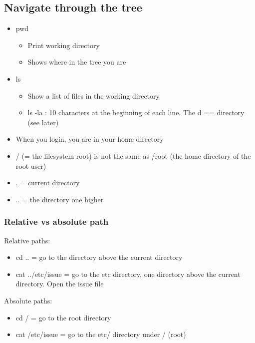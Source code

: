 \documentclass{article}
\begin{document}
\subsection{Navigate through the tree}

\begin{itemize}
    \item pwd
    \begin{itemize}
        \item Print working directory
        \item Shows where in the tree you are
    \end{itemize}
    \item ls
    \begin{itemize}
        \item Show a list of files in the working directory
        \item ls -la : 10 characters at the beginning of each line. The d == directory (see later)
    \end{itemize}
    \item When you login, you are in your home directory
    \item / (= the filesystem root) is not the same as /root (the home directory of the root user)
    \item . = current directory
    \item .. = the directory one higher
\end{itemize}

\subsubsection{Relative vs absolute path}

Relative paths:

\begin{itemize}
    \item cd .. = go to the directory above the current directory
    \item cat ../etc/issue = go to the etc directory, one directory above the current directory. Open the issue file
\end{itemize}

Absolute paths:

\begin{itemize}
    \item cd / = go to the root directory
    \item cat /etc/issue = go to the etc/ directory under / (root)
\end{itemize}
\end{document}
